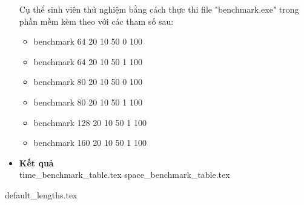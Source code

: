 \documentclass[class=report, crop=false]{standalone}
\begin{document}
\begin{itemize}
			Cụ thể sinh viên thử nghiệm bằng cách thực thi file "benchmark.exe" trong phần mềm kèm theo với các tham số sau:
			\begin{itemize}
				\ttfamily
				\item[] benchmark 64 20 10 50 0 100
				\item[] benchmark 64 20 10 50 1 100
				\item[] benchmark 80 20 10 50 0 100
				\item[] benchmark 80 20 10 50 1 100
				\item[] benchmark 128 20 10 50 1 100
				\item[] benchmark 160 20 10 50 1 100
			\end{itemize}
			\newpage
			\item[] {\sffamily\bfseries Kết quả} \\
			{time_benchmark_table.tex}
			\newpage
			{space_benchmark_table.tex}
		\end{itemize}
	\newpage
	{default_lengths.tex}
\end{document}
